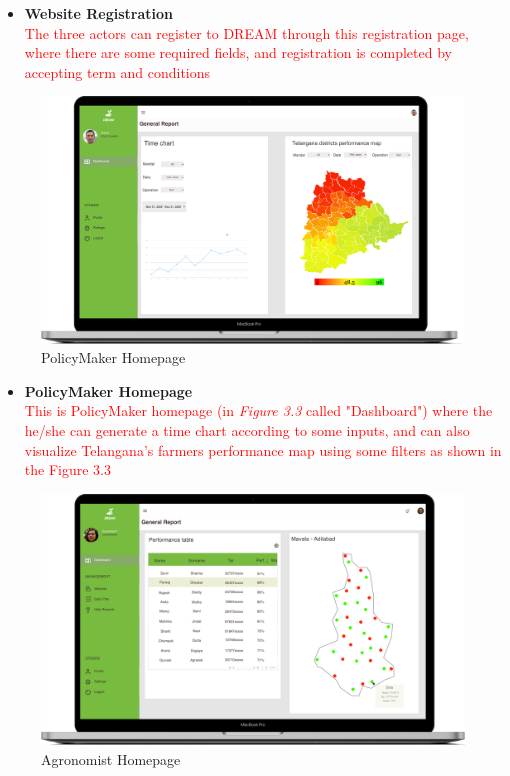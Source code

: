 \begin{itemize}
    \item \textbf{Website Registration}\\ 
    \textcolor{red}{The three actors can register to DREAM through this registration page, where there are some required fields, and registration is completed by accepting term and conditions}
\end{itemize}


\begin{figure}[H]
  \includegraphics[width=140mm,scale=0.9]{./Images//Mocks/WebApp/PolicyMaker.png}
  \caption{PolicyMaker Homepage}
\end{figure}

\begin{itemize}
    \item \textbf{PolicyMaker Homepage}\\ 
    \textcolor{red}{This is PolicyMaker homepage (in \textit{Figure 3.3} called "Dashboard") where the he/she can generate a time chart according to some inputs, and can also visualize Telangana's farmers performance map using some filters as shown in the Figure 3.3}
\end{itemize}


\begin{figure}[H]
  \includegraphics[width=140mm,scale=0.9]{./Images//Mocks/WebApp/Agronomist_Home.png}
  \caption{Agronomist Homepage}
\end{figure}

